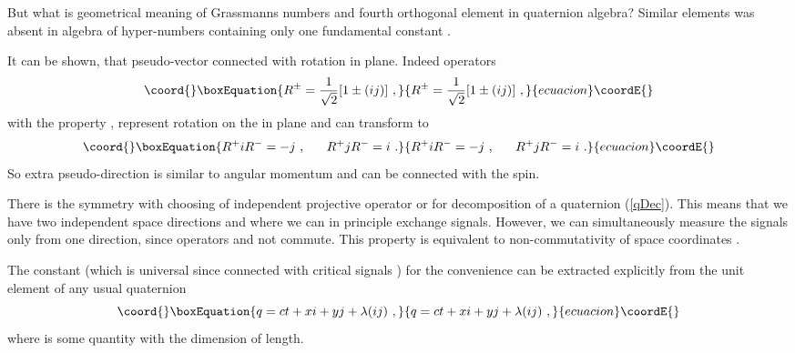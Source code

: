 \documentclass[a4paper,12pt]{article}
\begin{document}
But what is geometrical meaning of Grassmanns numbers and fourth orthogonal element 
in quaternion algebra? Similar elements was absent in algebra of hyper-numbers 
containing only one fundamental constant \coordHE{}. 

It can be shown, that pseudo-vector \coordHE{} connected with rotation in \coordHE{} plane. 
Indeed operators 
\begin{equation}\coord{}\boxEquation{ \label{Rq}
R^\pm = \frac{1}{\sqrt{2}}[1 \pm (ij)] ~,
}{ R^\pm = \frac{1}{\sqrt{2}}[1 \pm (ij)] ~,
}{ecuacion}\coordE{}\end{equation} 
with the property \coordHE{}, represent rotation on the \coordHE{} in \coordHE{} plane 
and can transform \coordHE{} to \coordHE{}
\begin{equation}\coord{}\boxEquation{ \label{i-j}
R^+iR^- = - j ~, ~~~~~ R^+jR^- = i~.
}{ R^+iR^- = - j ~, ~~~~~ R^+jR^- = i~.
}{ecuacion}\coordE{}\end{equation} 
So extra pseudo-direction \coordHE{} is similar to angular momentum and can be connected 
with the spin. 

There is the symmetry with choosing of independent projective operator \coordHE{} or 
\coordHE{} for decomposition of a quaternion (\ref{qDec}). This means that we have two 
independent space directions \coordHE{} and \coordHE{} where we can in principle exchange signals. 
However, we can simultaneously measure the signals only from one direction, since 
operators \coordHE{} and \coordHE{} not commute. This property is equivalent to 
non-commutativity of space coordinates \cite{Non}.

The constant \coordHE{} (which is universal since connected with critical signals \coordHE{}) 
for the convenience can be extracted explicitly from the unit element of any usual 
quaternion 
\begin{equation}\coord{}\boxEquation{ \label{dual}
q = ct + xi + yj + \lambda (ij) ~,
}{ q = ct + xi + yj + \lambda (ij) ~,
}{ecuacion}\coordE{}\end{equation} 
where \myHighlight{$\lambda$}\coordHE{} is some quantity with the dimension of length. 
\end{document}
